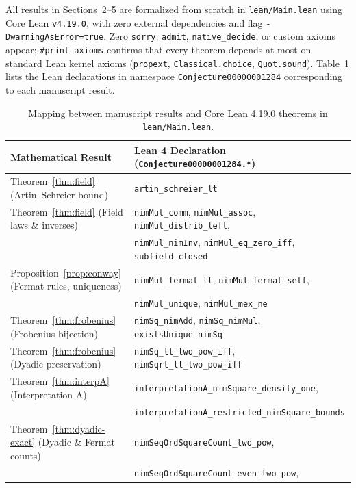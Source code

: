 \documentclass[11pt]{article}
\theoremstyle{definition}
\theoremstyle{remark}
\begin{document}
All results in Sections~2--5 are formalized from scratch in \texttt{lean/Main.lean} using Core Lean \texttt{v4.19.0}, with zero external dependencies and flag \texttt{-DwarningAsError=true}. Zero \texttt{sorry}, \texttt{admit}, \texttt{native\_\allowbreak decide}, or custom axioms appear; \texttt{\#print axioms} confirms that every theorem depends at most on standard Lean kernel axioms (\texttt{propext}, \texttt{Classical.choice}, \texttt{Quot.sound}). Table~\ref{tab:lean-map} lists the Lean declarations in namespace \texttt{Conjecture00000001284} corresponding to each manuscript result.

\begin{table}[!ht]
\centering
\caption{Mapping between manuscript results and Core Lean 4.19.0 theorems in \texttt{lean/Main.lean}.}
\label{tab:lean-map}
\vspace{0.4em}
\footnotesize
\setlength{\tabcolsep}{4.5pt}
\renewcommand{\arraystretch}{1.14}
\begin{tabular}{ll}
\hline
Mathematical Result & Lean 4 Declaration (\texttt{Conjecture00000001284.*}) \\
\hline
Theorem~\ref{thm:field} (Artin--Schreier bound) & \texttt{artin\_schreier\_lt} \\
Theorem~\ref{thm:field} (Field laws \& inverses) & \texttt{nimMul\_comm}, \texttt{nimMul\_assoc}, \texttt{nimMul\_distrib\_left}, \\
 & \texttt{nimMul\_nimInv}, \texttt{nimMul\_eq\_zero\_iff}, \texttt{subfield\_closed} \\
Proposition~\ref{prop:conway} (Fermat rules, uniqueness) & \texttt{nimMul\_fermat\_lt}, \texttt{nimMul\_fermat\_self}, \\
 & \texttt{nimMul\_unique}, \texttt{nimMul\_mex\_ne} \\
Theorem~\ref{thm:frobenius} (Frobenius bijection) & \texttt{nimSq\_nimAdd}, \texttt{nimSq\_nimMul}, \texttt{existsUnique\_nimSq} \\
Theorem~\ref{thm:frobenius} (Dyadic preservation) & \texttt{nimSq\_lt\_two\_pow\_iff}, \texttt{nimSqrt\_lt\_two\_pow\_iff} \\
Theorem~\ref{thm:interpA} (Interpretation A) & \texttt{interpretationA\_nimSquare\_density\_one}, \\
 & \texttt{interpretationA\_restricted\_nimSquare\_bounds} \\
Theorem~\ref{thm:dyadic-exact} (Dyadic \& Fermat counts) & \texttt{nimSeqOrdSquareCount\_two\_pow}, \\
 & \texttt{nimSeqOrdSquareCount\_even\_two\_pow}, \\

\end{tabular}
\end{table}
\end{document}
